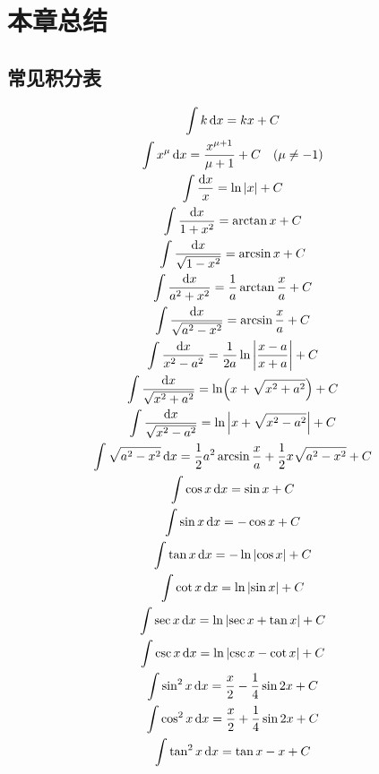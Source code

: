 \section{本章总结}
\subsection{常见积分表}
\begin{gather*}
	\int k \dd{x}
	= kx + C \\
	\int x^\mu \dd{x}
	= \frac{x^{\mu + 1}}{\mu + 1} + C \quad (\mu \neq -1) \\
	\int \frac{\dd{x}}{x}
	= \ln\abs{x} + C \\
	\int \frac{\dd{x}}{1 + x^2}
	= \arctan x + C \\
	\int \frac{\dd{x}}{\sqrt{1 - x^2}}
	= \arcsin x + C \\
	\int \frac{\dd{x}}{a^2 + x^2}
	= \frac{1}{a} \arctan\frac{x}{a} + C \\
	\int \frac{\dd{x}}{\sqrt{a^2 - x^2}}
	= \arcsin\frac{x}{a} + C \\
	\int \frac{\dd{x}}{x^2 - a^2}
	= \frac{1}{2a} \ln\abs{\frac{x - a}{x + a}} + C \\
	\int \frac{\dd{x}}{\sqrt{x^2 + a^2}}
	= \ln(x + \sqrt{x^2 + a^2}) + C \\
	\int \frac{\dd{x}}{\sqrt{x^2 - a^2}}
	= \ln\abs{x + \sqrt{x^2 - a^2}} + C \\
	\int \sqrt{a^2 - x^2} \dd{x}
	= \frac12 a^2 \arcsin\frac{x}{a} + \frac12 x \sqrt{a^2 - x^2} + C \\
	\int \cos x \dd{x}
	= \sin x + C \\
	\int \sin x \dd{x}
	= -\cos x + C \\
	\int \tan x \dd{x}
	= -\ln\abs{\cos x} + C \\
	\int \cot x \dd{x}
	= \ln\abs{\sin x} + C \\
	\int \sec x \dd{x}
	= \ln\abs{\sec x + \tan x} + C \\
	\int \csc x \dd{x}
	= \ln\abs{\csc x - \cot x} + C \\
	\int \sin^2 x \dd{x}
	= \frac{x}2 - \frac14 \sin 2x + C \\
	\int \cos^2 x \dd{x}
	= \frac{x}2 + \frac14 \sin 2x + C \\
	\int \tan^2 x \dd{x}
	= \tan x - x + C \\

\end{gather*}
